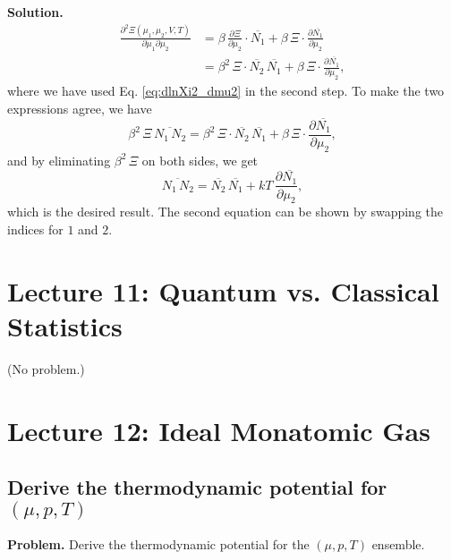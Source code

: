 \documentclass[twocolumn, 10pt]{article}
\numberwithin{equation}{section}
\newenvironment{problem}
{\par\medskip\sffamily \color{problue}
  \textbf{Problem. }\ignorespaces}
{\medskip}
\newenvironment{solution}
{\par\medskip
  \textbf{Solution. }\ignorespaces}
{\medskip}
\begin{document}
\begin{solution}
\begin{align*}
  \frac{ \partial^2 \Xi(\mu_1, \mu_2, V, T) }
       { \partial \mu_1 \partial \mu_2 }
  &=
    \beta \, \frac{ \partial \Xi } { \partial \mu_2 } \cdot
    \overline{ N_1 }
    +
    \beta \, \Xi \cdot
    \frac{ \partial \overline{ N_1 } } { \partial \mu_2 }
  \\
  &=
    \beta^2 \, \Xi \cdot
    \overline{ N_2 } \, \overline{ N_1 }
    +
    \beta \, \Xi \cdot
    \frac{ \partial \overline{ N_1 } } { \partial \mu_2 }
  ,
\end{align*}
%
where we have used Eq. \eqref{eq:dlnXi2_dmu2} in the second step.
To make the two expressions agree, we have
$$
  \beta^2 \, \Xi \, \overline{ N_1 \, N_2 }
  =
  \beta^2 \, \Xi \cdot
  \overline{ N_2 } \, \overline{ N_1 }
  +
  \beta \, \Xi \cdot
  \frac{ \partial \overline{ N_1 } } { \partial \mu_2 }
  ,
$$
and by eliminating $\beta^2 \, \Xi$
on both sides, we get
$$
  \overline{ N_1 \, N_2 }
  =
  \overline{ N_2 } \, \overline{ N_1 }
  +
  kT \,
  \frac{ \partial \overline{ N_1 } } { \partial \mu_2 }
  ,
$$
%
which is the desired result.
%
The second equation can be shown by swapping the indices for $1$ and $2$.
\end{solution}




\section{Lecture 11: Quantum vs. Classical Statistics}

(No problem.)

\section{Lecture 12: Ideal Monatomic Gas}

\subsection{Derive the thermodynamic potential for $(\mu, p, T)$}

\begin{problem}
Derive the thermodynamic potential for the $(\mu, p, T)$ ensemble.
\end{problem}
\end{document}

